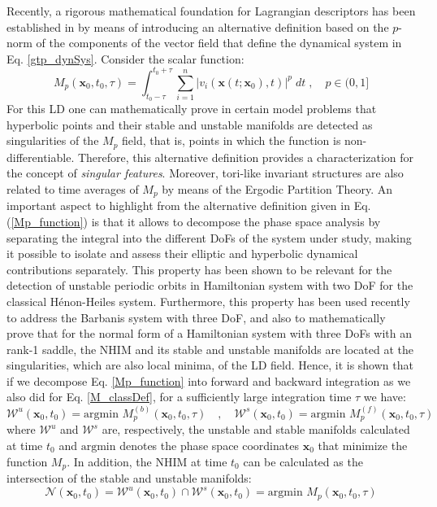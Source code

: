 \documentclass{ws-ijbc}
\begin{document}
Recently, a rigorous mathematical foundation for Lagrangian descriptors has been established in \cite{lopesino2017} by means of introducing an alternative definition  based on the $p$-norm of the components of the vector field that define the dynamical system in Eq. \eqref{gtp_dynSys}. Consider the scalar function:
\begin{equation}
M_p(\mathbf{x}_{0},t_0,\tau) = \int^{t_0+\tau}_{t_0-\tau} \sum_{i=1}^{n} |v_{i}(\mathbf{x}(t;\mathbf{x}_0),t)|^p \; dt \;,\quad p \in (0,1]
\label{Mp_function}
\end{equation}
For this LD one can mathematically prove in certain model problems that hyperbolic points and their stable and unstable manifolds are detected as singularities of the $M_p$ field, that is, points in which the function is non-differentiable. Therefore, this alternative definition provides a characterization for the concept of \textit{singular features}. Moreover, tori-like invariant structures are also related to time averages of $M_p$ by means of the Ergodic Partition Theory. An important aspect to highlight from the alternative definition given in Eq. (\ref{Mp_function}) is that it allows to decompose the phase space analysis by separating the integral into the different DoFs of the system under study, making it possible to isolate and assess their elliptic and hyperbolic dynamical contributions separately. This property has been shown to be relevant for the detection of unstable periodic orbits in Hamiltonian system with two DoF for the classical H\'{e}non-Heiles system\cite{demian2017}. Furthermore, this property has been used recently to address the Barbanis system with three DoF\cite{Naik2019b}, and also to mathematically prove that for the normal form of a Hamiltonian system with three DoFs with an rank-1 saddle, the NHIM and its stable and unstable manifolds are located at the singularities, which are also local minima, of the LD field. Hence, it is shown that if we decompose Eq. \eqref{Mp_function} into forward and backward integration as we also did for Eq. \eqref{M_classDef}, for a sufficiently large integration time $\tau$ we have:
\begin{equation}
\mathcal{W}^u(\mathbf{x}_{0},t_0) = \textrm{argmin } M_p^{(b)}(\mathbf{x}_{0},t_0,\tau) \quad,\quad \mathcal{W}^s(\mathbf{x}_{0},t_0) = \textrm{argmin } M_p^{(f)}(\mathbf{x}_{0},t_0,\tau)
\label{min_LD_manifolds}
\end{equation}
where $\mathcal{W}^u$ and $\mathcal{W}^s$ are, respectively, the unstable and stable manifolds calculated at time $t_0$ and $\textrm{argmin}$ denotes the phase space coordinates $\mathbf{x}_0$ that minimize the function $M_p$. In addition, the NHIM at time $t_0$ can be calculated as the intersection of the stable and unstable manifolds:
\begin{equation}
\mathcal{N}(\mathbf{x}_{0},t_0) = \mathcal{W}^u(\mathbf{x}_{0},t_0) \cap \mathcal{W}^s(\mathbf{x}_{0},t_0) = \textrm{argmin } M_p(\mathbf{x}_{0},t_0,\tau)
\label{min_NHIM_LD}
\end{equation}
\end{document}
